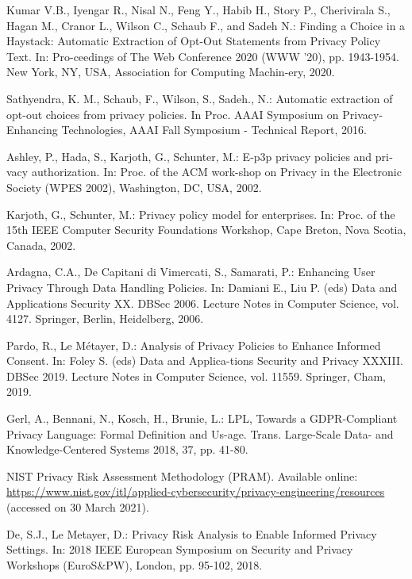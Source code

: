 \documentclass[../main]{subfiles}
\begin{document}
\begin{english}
\begin{biblenum}
     Kumar V.B., Iyengar R., Nisal N., Feng Y., Habib H., Story P., Cherivirala S., Hagan M., Cranor L., Wilson C., Schaub F., and Sadeh N.: Finding a Choice in a Haystack: Automatic Extraction of Opt-Out Statements from Privacy Policy Text. In: Pro-ceedings of The Web Conference 2020 (WWW ’20), pp. 1943-1954. New York, NY, USA, Association for Computing Machin-ery, 2020. 

     Sathyendra, K. M., Schaub, F., Wilson, S., Sadeh., N.: Automatic extraction of opt-out choices from privacy policies. In Proc. AAAI Symposium on Privacy-Enhancing Technologies, AAAI Fall Symposium - Technical Report, 2016.

     Ashley, P., Hada, S., Karjoth, G., Schunter, M.: E-p3p privacy policies and privacy authorization. In: Proc. of the ACM work-shop on Privacy in the Electronic Society (WPES 2002), Washington, DC, USA, 2002. 

     Karjoth, G., Schunter, M.: Privacy policy model for enterprises. In: Proc. of the 15th IEEE Computer Security Foundations Workshop, Cape Breton, Nova Scotia, Canada, 2002. 
    
     Ardagna, C.A., De Capitani di Vimercati, S., Samarati, P.: Enhancing User Privacy Through Data Handling Policies. In: Damiani E., Liu P. (eds) Data and Applications Security XX. DBSec 2006. Lecture Notes in Computer Science, vol. 4127. Springer, Berlin, Heidelberg, 2006. 

     Pardo, R., Le Métayer, D.: Analysis of Privacy Policies to Enhance Informed Consent. In: Foley S. (eds) Data and Applica-tions Security and Privacy XXXIII. DBSec 2019. Lecture Notes in Computer Science, vol. 11559. Springer, Cham, 2019. 

     Gerl, A., Bennani, N., Kosch, H., Brunie, L.: LPL, Towards a GDPR-Compliant Privacy Language: Formal Definition and Us-age. Trans. Large-Scale Data- and Knowledge-Centered Systems 2018, 37, pp. 41-80. 

     NIST Privacy Risk Assessment Methodology (PRAM). Available online: \url{https://www.nist.gov/itl/applied-cybersecurity/privacy-engineering/resources} (accessed on 30 March 2021).

     De, S.J., Le Metayer, D.: Privacy Risk Analysis to Enable Informed Privacy Settings. In: 2018 IEEE European Symposium on Security and Privacy Workshops (EuroS\&PW), London, pp. 95-102, 2018. 


\end{biblenum}
\end{english}
\end{document}
